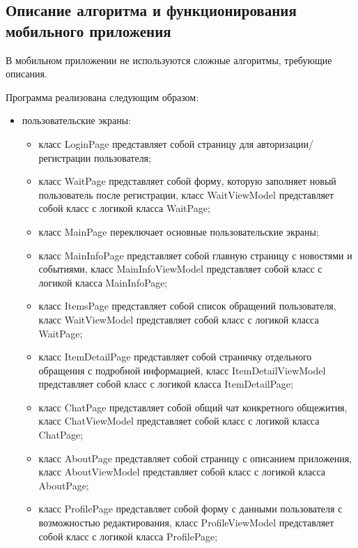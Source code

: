 \documentclass{../includes/TechDoc}
\begin{document}
    \newpage

    \subsection{Описание алгоритма и функционирования мобильного приложения}

    В мобильном приложении не используются сложные алгоритмы, требующие описания.

    Программа реализована следующим образом:
    \begin{itemize}
        \item пользовательские экраны:
        \begin{itemize}
            \item класс LoginPage представляет собой страницу для авторизации/регистрации пользователя;
            \item класс WaitPage представляет собой форму, которую заполняет новый пользователь после регистрации,
            класс WaitViewModel представляет собой класс с логикой класса WaitPage;
            \item класс MainPage переключает основные пользовательские экраны;
            \item класс MainInfoPage представляет собой главную страницу с новостями и событиями,
            класс MainInfoViewModel представляет собой класс с логикой класса MainInfoPage;
            \item класс ItemsPage представляет собой список обращений пользователя,
            класс WaitViewModel представляет собой класс с логикой класса WaitPage;
            \item класс ItemDetailPage представляет собой страничку отдельного обращения с подробной информацией,
            класс ItemDetailViewModel представляет собой класс с логикой класса ItemDetailPage;
            \item класс ChatPage представляет собой общий чат конкретного общежития,
            класс ChatViewModel представляет собой класс с логикой класса ChatPage;
            \item класс AboutPage представляет собой страницу с описанием приложения,
            класс AboutViewModel представляет собой класс с логикой класса AboutPage;
            \item класс ProfilePage представляет собой форму с данными пользователя с возможностью редактирования,
            класс ProfileViewModel представляет собой класс с логикой класса ProfilePage;
        \end{itemize}

\end{itemize}
\end{document}
